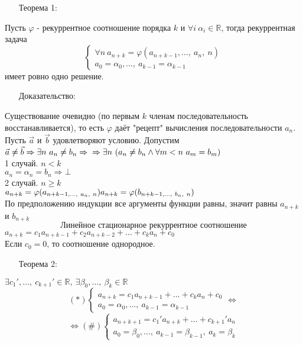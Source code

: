 \documentclass[12pt, letterpaper, twoside]{article}
\newcommand{\mb}[1]{\mathbb{#1}}
\begin{document}
\begin{enumerate}
    \item[Теорема 1:]
\end{enumerate}
Пусть $\varphi$ - рекуррентное соотношение порядка $k$ и $\forall i\ \alpha_i\in \mb{R}$, тогда рекуррентная задача
\[\begin{cases}
    \forall n\ a_{n + k} = \varphi(a_{n + k - 1},\dots,\ a_n,\ n)\\
    a_0 = \alpha_0,\dots,\ a_{k - 1} = \alpha_{k - 1}
\end{cases}\]
имеет ровно одно решение.
\begin{enumerate}
    \item[Доказательство:]
\end{enumerate}
Существование очевидно (по первым $k$ членам последовательность восстанавливается), то есть $\varphi$ даёт "рецепт" вычисления последовательности $a_n$.\\
Пусть $\vec{a}$ и $\vec{b}$ удовлетворяют условию. Допустим $\vec{a} \neq \vec{b}\Rightarrow \exists n\ a_n \neq b_n\Rightarrow\\
\Rightarrow \exists n\ (a_n \neq b_n \wedge  \forall m < n\ a_m = b_m)$\\
1 случай. $n < k$\\
$a_n = \alpha_n = b_n\Rightarrow \bot$\\
2 случай. $n \geq k$\\
$a_{n + k} = \varphi(a_{n + k - 1,\dots,\ a_n,\ n})\\
a_{n + k} = \varphi(b_{n + k - 1,\dots,\ b_n,\ n})$\\
По предположению индукции все аргументы функции равны, значит равны $a_{n + k}$ и $b_{n + k}$
\[\text{Линейное стационарное рекуррентное соотношение}\]
$a_{n + k} = c_1 a_{n + k - 1} + c_2a_{n + k - 2} + \dots + c_k a_n + c_0$\\
Если $c_0 = 0$, то соотношение однородное.
\begin{enumerate}
    \item[Теорема 2:]
\end{enumerate}
$\exists c_1',\dots,\ c_{k + 1}'\in \mb{R},\ \exists \beta_0,\dots,\ \beta_k\in \mb{R}$
\[(*)\begin{cases}
    a_{n + k} = c_1a_{n + k - 1} + \dots + c_k a_n + c_0\\
    a_0 = \alpha_0,\dots,\ a_{k - 1} = \alpha_{k - 1}
\end{cases}\Leftrightarrow\]
\[\Leftrightarrow (\#)\begin{cases}
    a_{n + k + 1} = c_1' a_{n + k} + \dots + c_{k + 1}' a_n\\
    a_0 = \beta_0,\dots,\ a_{k - 1} = \beta_{k - 1},\ a_{k} = \beta_{k}
\end{cases}\]
\end{document}
